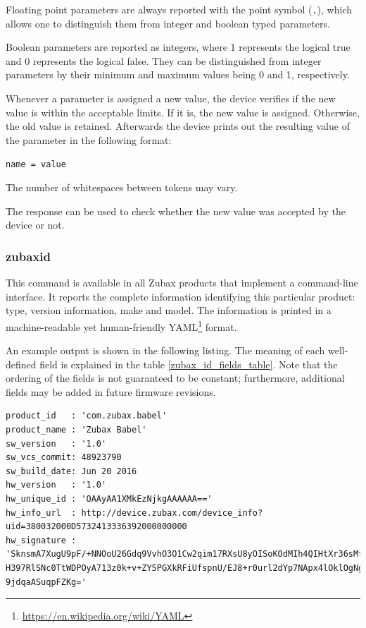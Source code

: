 \documentclass{zubaxdoc}
\begin{document}
Floating point parameters are always reported with the point symbol (\verb|.|),
which allows one to distinguish them from integer and boolean typed parameters.

Boolean parameters are reported as integers, where 1 represents the logical true and
0 represents the logical false.
They can be distinguished from integer parameters by their minimum and maximum values being 0 and 1,
respectively.

Whenever a parameter is assigned a new value, the device verifies if the new value is within the
acceptable limits.
If it is, the new value is assigned. Otherwise, the old value is retained.
Afterwards the device prints out the resulting value of the parameter in the following format:

\verb|name = value|

The number of whitespaces between tokens may vary.

The response can be used to check whether the new value was accepted by the device or not.

\subsubsection{zubax\textunderscore{}id}

This command is available in all Zubax products that implement a command-line interface.
It reports the complete information identifying this particular product:
type, version information, make and model.
The information is printed in a machine-readable yet human-friendly
YAML\footnote{\url{https://en.wikipedia.org/wiki/YAML}} format.

An example output is shown in the following listing.
The meaning of each well-defined field is explained in the table \ref{zubax_id_fields_table}.
Note that the ordering of the fields is not guaranteed to be constant;
furthermore, additional fields may be added in future firmware revisions.

\begin{minipage}{0.9\textwidth} %
\begin{verbatim}
product_id   : 'com.zubax.babel'
product_name : 'Zubax Babel'
sw_version   : '1.0'
sw_vcs_commit: 48923790
sw_build_date: Jun 20 2016
hw_version   : '1.0'
hw_unique_id : 'OAAyAA1XMkEzNjkgAAAAAA=='
hw_info_url  : http://device.zubax.com/device_info?uid=380032000D5732413336392000000000
hw_signature : 'SknsmA7XugU9pF/+NNOoU26Gdq9VvhO3O1Cw2qim17RXsU8yOISoKOdMIh4QIHtXr36sMfx
H397RlSNc0TtWDPOyA713z0k+v+ZY5PGXkRFiUfspnU/EJ8+r0url2dYp7NApx4lOklOgNgHrGCA6lPxA8UqoW
9jdqaASuqpFZKg='
\end{verbatim}
\end{minipage}
\end{document}
